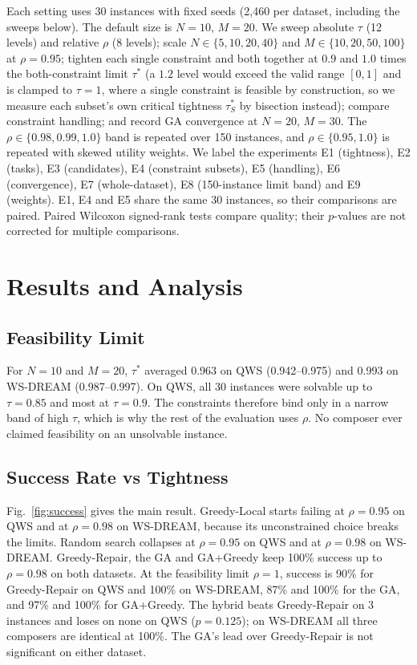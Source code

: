\documentclass[conference]{IEEEtran}
\begin{document}
Each setting uses 30 instances with fixed seeds (2,460 per dataset, including the sweeps below). The default size is $N=10$, $M=20$. We sweep absolute $\tau$ (12 levels) and relative $\rho$ (8 levels); scale $N\in\{5,10,20,40\}$ and $M\in\{10,20,50,100\}$ at $\rho=0.95$; tighten each single constraint and both together at $0.9$ and $1.0$ times the both-constraint limit $\tau^{*}$ (a $1.2$ level would exceed the valid range $[0,1]$ and is clamped to $\tau=1$, where a single constraint is feasible by construction, so we measure each subset's own critical tightness $\tau^{*}_S$ by bisection instead); compare constraint handling; and record GA convergence at $N=20$, $M=30$. The $\rho\in\{0.98,0.99,1.0\}$ band is repeated over 150 instances, and $\rho\in\{0.95,1.0\}$ is repeated with skewed utility weights. We label the experiments E1 (tightness), E2 (tasks), E3 (candidates), E4 (constraint subsets), E5 (handling), E6 (convergence), E7 (whole-dataset), E8 (150-instance limit band) and E9 (weights). E1, E4 and E5 share the same 30 instances, so their comparisons are paired. Paired Wilcoxon signed-rank tests compare quality; their $p$-values are not corrected for multiple comparisons.

\section{Results and Analysis}\label{sec:results}

\subsection{Feasibility Limit}
For $N=10$ and $M=20$, $\tau^{*}$ averaged 0.963 on QWS (0.942--0.975) and 0.993 on WS-DREAM (0.987--0.997). On QWS, all 30 instances were solvable up to $\tau=0.85$ and most at $\tau=0.9$. The constraints therefore bind only in a narrow band of high $\tau$, which is why the rest of the evaluation uses $\rho$. No composer ever claimed feasibility on an unsolvable instance.

\subsection{Success Rate vs Tightness}
Fig.~\ref{fig:success} gives the main result. Greedy-Local starts failing at $\rho=0.95$ on QWS and at $\rho=0.98$ on WS-DREAM, because its unconstrained choice breaks the limits. Random search collapses at $\rho=0.95$ on QWS and at $\rho=0.98$ on WS-DREAM. Greedy-Repair, the GA and GA+Greedy keep 100\% success up to $\rho=0.98$ on both datasets. At the feasibility limit $\rho=1$, success is 90\% for Greedy-Repair on QWS and 100\% on WS-DREAM, 87\% and 100\% for the GA, and 97\% and 100\% for GA+Greedy. The hybrid beats Greedy-Repair on 3 instances and loses on none on QWS ($p=0.125$); on WS-DREAM all three composers are identical at 100\%. The GA's lead over Greedy-Repair is not significant on either dataset.
\end{document}
